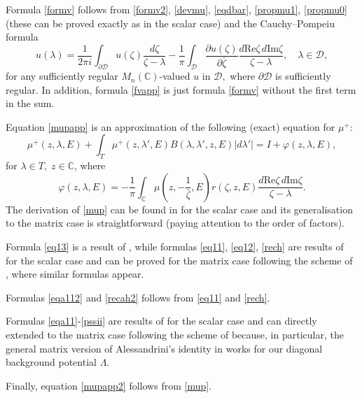 \documentclass[11pt,a4paper,english,subeqn]{amsart}
\theoremstyle{plain}
\theoremstyle{definition}
\numberwithin{equation}{section}
\begin{document}
Formula \eqref{formv} follows from \eqref{formv2}, \eqref{devmu}, \eqref{eqdbar}, \eqref{propmu1}, \eqref{propmu0} (these can be proved exactly as in the scalar case) and the Cauchy--Pompeiu formula
\begin{equation}
u(\lambda) = \frac{1}{2 \pi i} \int_{\partial \mathcal{D}} u(\zeta) \frac{d \zeta}{\zeta - \lambda} -\frac 1 \pi \int_{\mathcal{D}} \frac{\partial u(\zeta)}{\partial \bar \zeta} \frac{d {\mathrm{Re}} \zeta \, d {\mathrm{Im}} \zeta}{\zeta - \lambda}, \quad \lambda \in \mathcal{D},
\end{equation}
for any sufficiently regular ${M_{n}({\mathbb{C}})}$-valued $u$ in $\mathcal{D},$ where $\partial \mathcal{D}$ is sufficiently regular. In addition, formula \eqref{fvapp} is just formula \eqref{formv} without the first term in the sum.

Equation \eqref{mupapp} is an approximation of the following (exact) equation for $\mu^+$:
\begin{equation} \label{mup}
\mu^+(z,\lambda,E) +\int_T \mu^+(z,\lambda',E) B(\lambda,\lambda',z,E)  |d\lambda'| =I + \varphi(z,\lambda,E),
\end{equation}
for $\lambda \in T, \; z \in {\mathbb{C}}$, where
\begin{equation} \label{deffi}
\varphi(z,\lambda,E) = - \frac 1 \pi \int_{\mathbb{C}}\mu\left(z, -\frac{1}{\bar \zeta}, E\right) r(\zeta,z,E) \frac{d {\mathrm{Re}} \zeta \, d {\mathrm{Im}} \zeta}{\zeta - \lambda}.
\end{equation}
The derivation of \eqref{mup} can be found in \cite{N4} for the scalar case and its generalisation to the matrix case is straightforward (paying attention to the order of factors).\smallskip

Formula \eqref{eq13} is a result of \cite{F2}, while formulas \eqref{eq11}, \eqref{eq12}, \eqref{rech} are results of \cite{N1} for the scalar case and can be proved for the matrix case following the scheme of \cite{NS2}, where similar formulas appear.\smallskip

Formulas \eqref{eqa112} and \eqref{recah2} follows from \eqref{eq11} and \eqref{rech}.

Formulas \eqref{eqa11}-\eqref{pssii} are results of \cite{N5} for the scalar case and can directly extended to the matrix case following the scheme of \cite{NS2} because, in particular, the general matrix version of Alessandrini's identity in \cite{NS2} works for our diagonal background potential $\Lambda$.

Finally, equation \eqref{mupapp2} follows from \eqref{mup}. 
\end{document}
